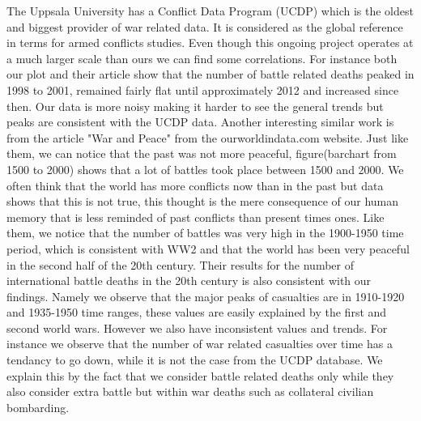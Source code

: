 The Uppsala University has a Conflict Data Program (UCDP) which is the oldest and biggest provider of war related data. It is considered as the global reference in terms for armed conflicts studies. Even though this ongoing project operates at a much larger scale than ours we can find some correlations. For instance both our plot and their article show that the number of battle related deaths peaked in 1998 to 2001, remained fairly flat until approximately 2012 and increased since then. Our data is more noisy making it harder to see the general trends but peaks are consistent with the UCDP data.
Another interesting similar work is from the article "War and Peace" from the ourworldindata.com website. Just like them, we can notice that the past was not more peaceful, figure(barchart from 1500 to 2000) shows that a lot of battles took place between 1500 and 2000. We often think that the world has more conflicts now than in the past but data shows that this is not true, this thought is the mere consequence of our human memory that is less reminded of past conflicts than present times ones. Like them, we notice that the number of battles was very high in the 1900-1950 time period, which is consistent with WW2 and that the world has been very peaceful in the second half of the 20th century. Their results for the number of international battle deaths in the 20th century is also consistent with our findings. Namely we observe that the major peaks of casualties are in 1910-1920 and 1935-1950 time ranges, these values are easily explained by the first and second world wars.
However we also have inconsistent values and trends. For instance we observe that the number of war related casualties over time has a tendancy to go down, while it is not the case from the UCDP database. We explain this by the fact that we consider battle related deaths only while they also consider extra battle but within war deaths such as collateral civilian bombarding.


